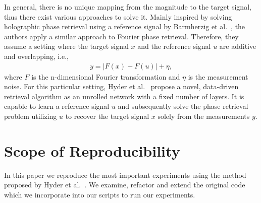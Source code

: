 In general, there is no unique mapping from the magnitude to the target signal, thus there exist various approaches to solve it. Mainly inspired by solving holographic phase retrieval using a reference signal by Barmherzig et al.~\cite{holographicPhasRetrieval}, the authors apply a similar approach to Fourier phase retrieval. Therefore, they assume a setting where the target signal $x$ and the reference signal $u$ are additive and overlapping, i.e.,
\begin{align}
	y = | F(x) + F(u) | + \eta,
\end{align}
where $F$ is the n-dimensional Fourier transformation and $\eta$ is the measurement noise. For this particular setting, Hyder et al.~\cite{hyder2020solving} propose a novel, data-driven retrieval algorithm as an unrolled network with a fixed number of layers. It is capable to learn a reference signal $u$ and subsequently solve the phase retrieval problem utilizing $u$ to recover the target signal $x$ solely from the measurements $y$.

\section{Scope of Reproducibility}




In this paper we reproduce the most important experiments using the method proposed by Hyder et al.~\cite{hyder2020solving}. We examine, refactor and extend the original code which we incorporate into our scripts to run our experiments.

